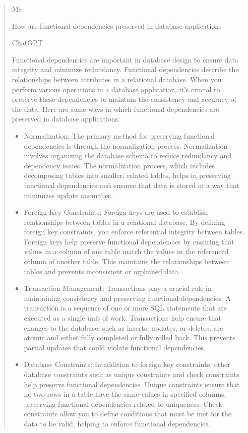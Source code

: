 \documentclass[11pt]{article}
\begin{document}
\begin{enumerate}
\begin{quotation}
Me

How are functional dependencies preserved in database applications

ChatGPT

Functional dependencies are important in database design to ensure data integrity and minimize redundancy. Functional dependencies describe the relationships between attributes in a relational database. When you perform various operations in a database application, it's crucial to preserve these dependencies to maintain the consistency and accuracy of the data. Here are some ways in which functional dependencies are preserved in database applications:
\begin{itemize}
\item    Normalization:
        The primary method for preserving functional dependencies is through the normalization process. Normalization involves organizing the database schema to reduce redundancy and dependency issues.
        The normalization process, which includes decomposing tables into smaller, related tables, helps in preserving functional dependencies and ensures that data is stored in a way that minimizes update anomalies.

 \item   Foreign Key Constraints:
        Foreign keys are used to establish relationships between tables in a relational database. By defining foreign key constraints, you enforce referential integrity between tables.
        Foreign keys help preserve functional dependencies by ensuring that values in a column of one table match the values in the referenced column of another table. This maintains the relationships between tables and prevents inconsistent or orphaned data.

 \item   Transaction Management:
        Transactions play a crucial role in maintaining consistency and preserving functional dependencies. A transaction is a sequence of one or more SQL statements that are executed as a single unit of work.
        Transactions help ensure that changes to the database, such as inserts, updates, or deletes, are atomic and either fully completed or fully rolled back. This prevents partial updates that could violate functional dependencies.

\item    Database Constraints:
        In addition to foreign key constraints, other database constraints such as unique constraints and check constraints help preserve functional dependencies.
        Unique constraints ensure that no two rows in a table have the same values in specified columns, preserving functional dependencies related to uniqueness.
        Check constraints allow you to define conditions that must be met for the data to be valid, helping to enforce functional dependencies.


\end{itemize}
\end{quotation}
\end{enumerate}
\end{document}
